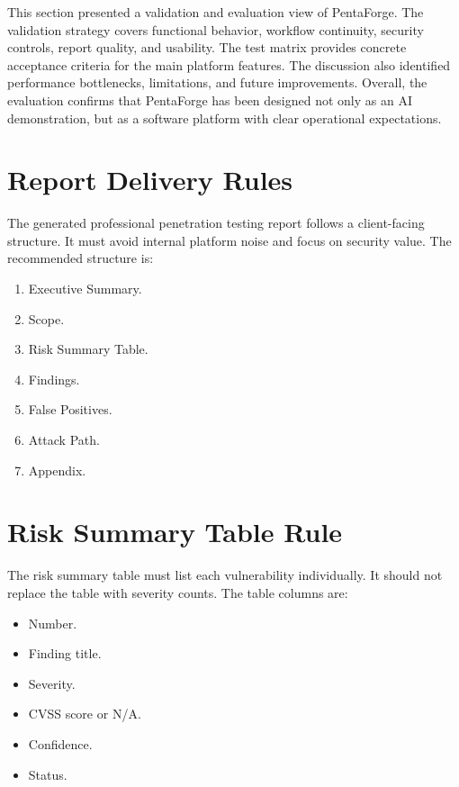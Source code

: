 \documentclass[12pt,a4paper]{report}
\begin{document}
This section presented a validation and evaluation view of PentaForge. The validation
strategy covers functional behavior, workflow continuity, security controls, report
quality, and usability. The test matrix provides concrete acceptance criteria for the
main platform features. The discussion also identified performance bottlenecks,
limitations, and future improvements. Overall, the evaluation confirms that PentaForge
has been designed not only as an AI demonstration, but as a software platform with
clear operational expectations.

\newpage
\section{Report Delivery Rules}

The generated professional penetration testing report follows a client-facing structure. It must
avoid internal platform noise and focus on security value. The recommended structure is:

\begin{enumerate}
    \item Executive Summary.
    \item Scope.
    \item Risk Summary Table.
    \item Findings.
    \item False Positives.
    \item Attack Path.
    \item Appendix.
\end{enumerate}

\section*{Risk Summary Table Rule}

The risk summary table must list each vulnerability individually. It should not replace
the table with severity counts. The table columns are:

\begin{itemize}
    \item Number.
    \item Finding title.
    \item Severity.
    \item CVSS score or N/A.
    \item Confidence.
    \item Status.
\end{itemize}
\end{document}
